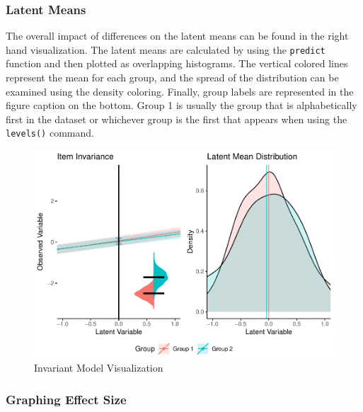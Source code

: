 \documentclass[
  man]{apa6}
\begin{document}
\hypertarget{latent-means}{%
\subsubsection{Latent Means}\label{latent-means}}

The overall impact of differences on the latent means can be found in the right hand visualization. The latent means are calculated by using the \texttt{predict} function and then plotted as overlapping histograms. The vertical colored lines represent the mean for each group, and the spread of the distribution can be examined using the density coloring. Finally, group labels are represented in the figure caption on the bottom. Group 1 is usually the group that is alphabetically first in the dataset or whichever group is the first that appears when using the \texttt{levels()} command.

\begin{figure}
\centering
\includegraphics{manuscript_files/figure-latex/invariant-pic-1.pdf}
\caption{\label{fig:invariant-pic}Invariant Model Visualization}
\end{figure}

\hypertarget{graphing-effect-size}{%
\subsubsection{Graphing Effect Size}\label{graphing-effect-size}}
\end{document}
